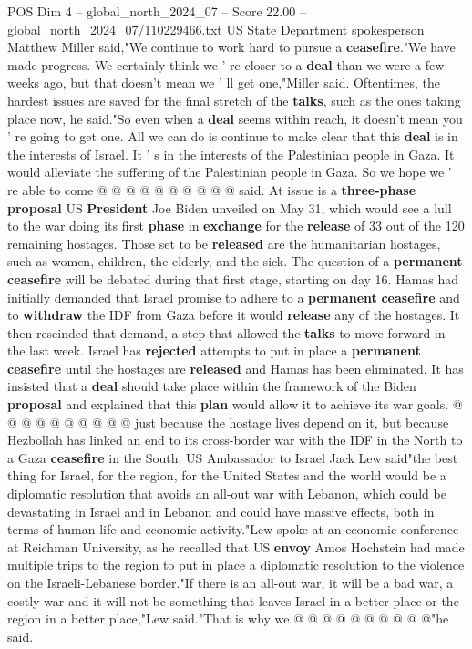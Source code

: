 \begin{textsample}{POS Dim 4 – global\_north\_2024\_07 – Score 22.00 – global\_north\_2024\_07/110229466.txt}
US State Department spokesperson Matthew Miller said,"We continue to work hard to pursue a \textbf{ceasefire}."We have made progress.
We certainly think we ' re closer to a \textbf{deal} than we were a few weeks ago, but that doesn't mean we ' ll get one,"Miller said.
Oftentimes, the hardest issues are saved for the final stretch of the \textbf{talks}, such as the ones taking place now, he said."So even when a \textbf{deal} seems within reach, it doesn't mean you ' re going to get one.
All we can do is continue to make clear that this \textbf{deal} is in the interests of Israel.
It ' s in the interests of the Palestinian people in Gaza.
It would alleviate the suffering of the Palestinian people in Gaza.
So we hope we ' re able to come @ @ @ @ @ @ @ @ @ @ said.
At issue is a \textbf{three-phase} \textbf{proposal} US \textbf{President} Joe Biden unveiled on May 31, which would see a lull to the war doing its first \textbf{phase} in \textbf{exchange} for the \textbf{release} of 33 out of the 120 remaining hostages.
Those set to be \textbf{released} are the humanitarian hostages, such as women, children, the elderly, and the sick.
The question of a \textbf{permanent} \textbf{ceasefire} will be debated during that first stage, starting on day 16.
Hamas had initially demanded that Israel promise to adhere to a \textbf{permanent} \textbf{ceasefire} and to \textbf{withdraw} the IDF from Gaza before it would \textbf{release} any of the hostages.
It then rescinded that demand, a step that allowed the \textbf{talks} to move forward in the last week.
Israel has \textbf{rejected} attempts to put in place a \textbf{permanent} \textbf{ceasefire} until the hostages are \textbf{released} and Hamas has been eliminated.
It has insisted that a \textbf{deal} should take place within the framework of the Biden \textbf{proposal} and explained that this \textbf{plan} would allow it to achieve its war goals. @ @ @ @ @ @ @ @ @ @ just because the hostage lives depend on it, but because Hezbollah has linked an end to its cross-border war with the IDF in the North to a Gaza \textbf{ceasefire} in the South.
US Ambassador to Israel Jack Lew said"the best thing for Israel, for the region, for the United States and the world would be a diplomatic resolution that avoids an all-out war with Lebanon, which could be devastating in Israel and in Lebanon and could have massive effects, both in terms of human life and economic activity."Lew spoke at an economic conference at Reichman University, as he recalled that US \textbf{envoy} Amos Hochstein had made multiple trips to the region to put in place a diplomatic resolution to the violence on the Israeli-Lebanese border."If there is an all-out war, it will be a bad war, a costly war and it will not be something that leaves Israel in a better place or the region in a better place,"Lew said."That is why we @ @ @ @ @ @ @ @ @ @"he said.

\end{textsample}

